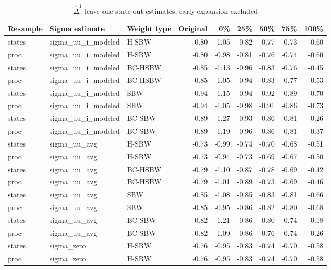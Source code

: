 \begin{table}[ht]
\label{tab:rdiffc2}
\caption{$\hat{\Delta}^1_v$ leave-one-state-out estimates, early expansion excluded}
\centering
\begin{tabular}{lllrrrrrr}
  \hline
Resample & Sigma estimate & Weight type & Original & 0\% & 25\% & 50\% & 75\% & 100\% \\ 
  \hline
states & sigma\_uu\_i\_modeled & H-SBW & -0.80 & -1.05 & -0.82 & -0.77 & -0.73 & -0.60 \\ 
  proc & sigma\_uu\_i\_modeled & H-SBW & -0.80 & -0.98 & -0.81 & -0.76 & -0.74 & -0.60 \\ 
  states & sigma\_uu\_i\_modeled & BC-HSBW & -0.85 & -1.13 & -0.96 & -0.83 & -0.76 & -0.45 \\ 
  proc & sigma\_uu\_i\_modeled & BC-HSBW & -0.85 & -1.05 & -0.94 & -0.83 & -0.77 & -0.53 \\ 
  states & sigma\_uu\_i\_modeled & SBW & -0.94 & -1.15 & -0.94 & -0.92 & -0.89 & -0.70 \\ 
  proc & sigma\_uu\_i\_modeled & SBW & -0.94 & -1.05 & -0.98 & -0.91 & -0.86 & -0.73 \\ 
  states & sigma\_uu\_i\_modeled & BC-SBW & -0.89 & -1.27 & -0.93 & -0.86 & -0.81 & -0.26 \\ 
  proc & sigma\_uu\_i\_modeled & BC-SBW & -0.89 & -1.19 & -0.96 & -0.86 & -0.81 & -0.37 \\ 
  states & sigma\_uu\_avg & H-SBW & -0.73 & -0.99 & -0.74 & -0.70 & -0.68 & -0.51 \\ 
  proc & sigma\_uu\_avg & H-SBW & -0.73 & -0.94 & -0.73 & -0.69 & -0.67 & -0.50 \\ 
  states & sigma\_uu\_avg & BC-HSBW & -0.79 & -1.10 & -0.87 & -0.78 & -0.69 & -0.42 \\ 
  proc & sigma\_uu\_avg & BC-HSBW & -0.79 & -1.01 & -0.89 & -0.73 & -0.69 & -0.46 \\ 
  states & sigma\_uu\_avg & SBW & -0.85 & -1.08 & -0.85 & -0.83 & -0.81 & -0.66 \\ 
  proc & sigma\_uu\_avg & SBW & -0.85 & -0.95 & -0.86 & -0.82 & -0.80 & -0.68 \\ 
  states & sigma\_uu\_avg & BC-SBW & -0.82 & -1.21 & -0.86 & -0.80 & -0.74 & -0.18 \\ 
  proc & sigma\_uu\_avg & BC-SBW & -0.82 & -1.09 & -0.86 & -0.76 & -0.74 & -0.26 \\ 
  states & sigma\_zero & H-SBW & -0.76 & -0.95 & -0.83 & -0.74 & -0.70 & -0.58 \\ 
  proc & sigma\_zero & H-SBW & -0.76 & -0.95 & -0.83 & -0.74 & -0.70 & -0.58 \\ 

\end{tabular}
\end{table}
